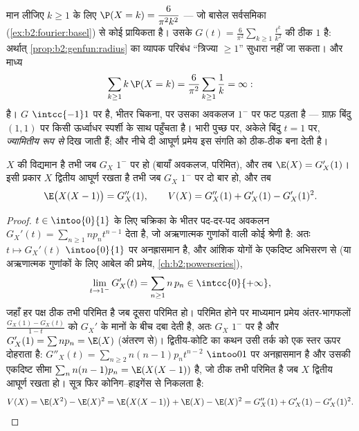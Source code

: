 \begin{example}[ठीक एक त्रिज्या वाला कोई
नियम]\label{ex:b2:genfun:heavytail}
मान लीजिए $k \geq 1$ के लिए $\P(X = k) = \dfrac{6}{\pi^2k^2}$ --- जो बासेल सर्वसमिका (\cref{ex:b2:fourier:basel}) से कोई
प्रायिकता  है। उसके  $G(t) = \frac6{\pi^2}\sum_{k\geq1}\frac{t^k}{k^2}$ की  ठीक $1$ है:
अर्थात् \cref{prop:b2:genfun:radius} का व्यापक परिबंध ``त्रिज्या $\geq
1$'' सुधारा नहीं जा सकता।
और माध्य
\[
\sum_{k\geq1}k\,\P(X = k) =
\frac6{\pi^2}\sum_{k\geq1}\frac1k = \infty :
\]
है। $G$ $\intcc{-1}1$ पर  है, भीतर चिकना, पर उसका अवकलज $1^-$ पर फट
पड़ता है --- ग्राफ़ बिंदु $(1, 1)$ पर किसी ऊर्ध्वाधर स्पर्शी के साथ
पहुँचता है। भारी पुच्छ  पर, अकेले बिंदु $t = 1$ पर,
\emph{ज्यामितीय रूप से} दिख जाती हैं; और नीचे दी आघूर्ण प्रमेय इस
संगति को ठीक-ठीक बना देती है।
\end{example}

\begin{theorem}\label{thm:b2:genfun:moments}
$X$ की  विद्यमान है तभी जब $G_X$ $1^-$ पर  हो (बायाँ
अवकलज, परिमित), और तब $\E(X) = G_X'(1)$। इसी प्रकार $X$ द्वितीय आघूर्ण रखता है
तभी जब $G_X$ $1^-$ पर दो बार  हो, और तब
\[
\E\bigl(X(X - 1)\bigr) = G_X''(1),
\qquad
V(X) = G_X''(1) + G_X'(1) - G_X'(1)^2 .
\]
\end{theorem}

\begin{proof}
$t \in \intoo{0}{1}$ के लिए चक्रिका के भीतर पद-दर-पद अवकलन $G_X'(t) = \sum_{n\geq1} np_n t^{n-1}$ देता है, जो
अऋणात्मक गुणांकों वाली कोई श्रेणी है: अतः $t \mapsto G_X'(t)$ $\intoo{0}{1}$ पर अनह्रासमान है,
और आंशिक योगों के एकदिष्ट अभिसरण से (या अऋणात्मक गुणांकों के लिए
आबेल की प्रमेय, \cref{ch:b2:powerseries}),
\[
\lim_{t \to 1^-} G_X'(t)
= \sum_{n\geq1} n\,p_n \in \intcc{0}{+\infty} ,
\]
जहाँ हर पक्ष ठीक तभी परिमित है जब दूसरा परिमित हो। परिमित होने पर
माध्यमान प्रमेय अंतर-भागफलों $\frac{G_X(1) -
G_X(t)}{1 - t}$ को $G_X'$ के मानों के बीच दबा देती
है, अतः $G_X$ $1^-$ पर  है और $G_X'(1) = \sum np_n = \E(X)$ (अंतरण से)। द्वितीय-कोटि का
कथन उसी तर्क को एक स्तर ऊपर दोहराता है: $G''_X(t) = \sum_{n\geq2}n(n-1)p_nt^{n-2}$ $\intoo01$ पर अनह्रासमान है
और उसकी एकदिष्ट सीमा $\sum_nn(n-1)p_n = \E(X(X-1))$ है, जो ठीक तभी परिमित है जब $X$
द्वितीय आघूर्ण रखता हो।  सूत्र फिर कोनिग--हाइगेंस से निकलता
है:
\[
V(X) = \E(X^2) - \E(X)^2 = \E\bigl(X(X-1)\bigr) + \E(X) -
\E(X)^2 = G''_X(1) + G'_X(1) - G'_X(1)^2 .
\]
\end{proof}

